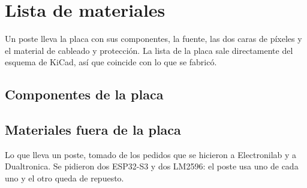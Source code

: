 \chapter{Lista de materiales}\label{cap:materiales}

Un poste lleva la placa  con sus componentes, la fuente, las dos caras de píxeles y el material de cableado y protección. La lista de la placa sale directamente del esquema de KiCad, así que coincide con lo que se fabricó.

\section{Componentes de la placa}




\section{Materiales fuera de la placa}

Lo que lleva un poste, tomado de los pedidos que se hicieron a Electronilab y a Dualtronica. Se pidieron dos ESP32-S3 y dos LM2596: el poste usa uno de cada uno y el otro queda de repuesto.


